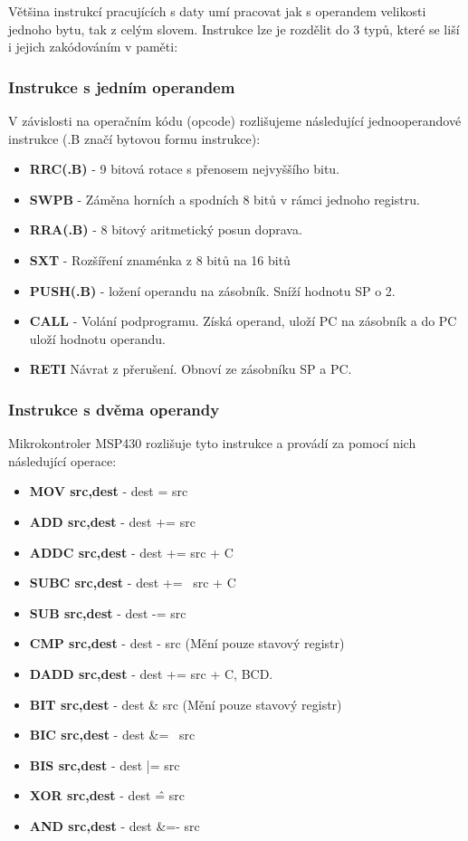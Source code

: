 Většina instrukcí pracujících s daty umí pracovat jak s operandem velikosti jednoho bytu, tak z celým slovem. Instrukce lze je rozdělit do 3 typů, které se liší i jejich zakódováním v paměti:

\subsubsection{Instrukce s jedním operandem}

V závislosti na operačním kódu (opcode) rozlišujeme následující jednooperandové instrukce (.B značí bytovou formu instrukce):

\begin{itemize}
\item \textbf{RRC(.B)} - 9 bitová rotace s přenosem nejvyššího bitu.
\item \textbf{SWPB} - Záměna horních a spodních 8 bitů v rámci jednoho registru.
\item \textbf{RRA(.B)} - 8 bitový aritmetický posun doprava.
\item \textbf{SXT} - Rozšíření znaménka z 8 bitů na 16 bitů
\item \textbf{PUSH(.B)} - ložení operandu na zásobník. Sníží hodnotu SP o 2.
\item \textbf{CALL} - Volání podprogramu. Získá operand, uloží PC na zásobník a do PC uloží hodnotu operandu.
\item \textbf{RETI}	Návrat z přerušení. Obnoví ze zásobníku SP a PC.
\end{itemize}

\subsubsection{Instrukce s dvěma operandy}

Mikrokontroler MSP430 rozlišuje tyto instrukce a provádí za pomocí nich následující operace:

\begin{itemize}
\item \textbf{MOV src,dest} - dest = src
\item \textbf{ADD src,dest} - dest += src
\item \textbf{ADDC src,dest} - dest += src + C
\item \textbf{SUBC src,dest} - dest += ~src + C
\item \textbf{SUB src,dest} - dest -= src
\item \textbf{CMP src,dest} - dest - src (Mění pouze stavový registr)
\item \textbf{DADD src,dest} - dest += src + C, BCD.
\item \textbf{BIT src,dest} - dest \& src (Mění pouze stavový registr)
\item \textbf{BIC src,dest} - dest \&= ~src
\item \textbf{BIS src,dest} - dest |= src
\item \textbf{XOR src,dest} - dest \^ = src
\item \textbf{AND src,dest} - dest \&=- src
\end{itemize}

